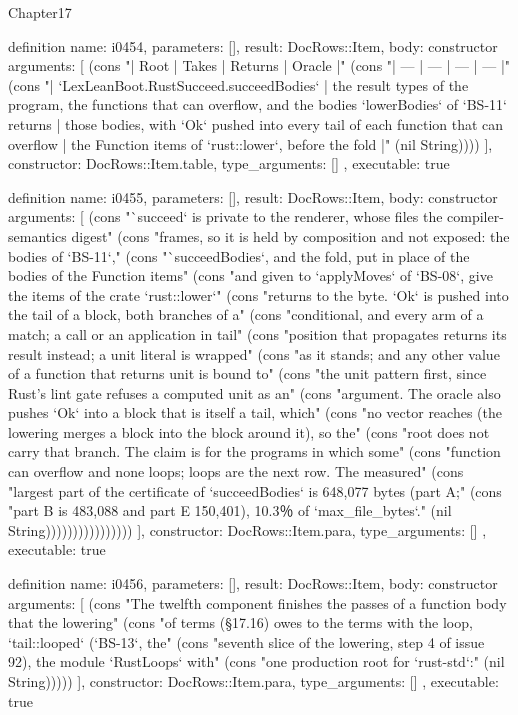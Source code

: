 \begin{lexlean}{Chapter17}
\begin{semanticmodule}
definition{
  name: i0454,
  parameters: [],
  result: DocRows::Item,
  body: constructor{
    arguments: [
      (cons "| Root | Takes | Returns | Oracle |" (cons "| --- | --- | --- | --- |" (cons "| `LexLeanBoot.RustSucceed.succeedBodies` | the result types of the program, the functions that can overflow, and the bodies `lowerBodies` of `BS-11` returns | those bodies, with `Ok` pushed into every tail of each function that can overflow | the Function items of `rust::lower`, before the fold |" (nil String))))
    ],
    constructor: DocRows::Item.table,
    type_arguments: []
  },
  executable: true
}

definition{
  name: i0455,
  parameters: [],
  result: DocRows::Item,
  body: constructor{
    arguments: [
      (cons "`succeed` is private to the renderer, whose files the compiler-semantics digest" (cons "frames, so it is held by composition and not exposed: the bodies of `BS-11`," (cons "`succeedBodies`, and the fold, put in place of the bodies of the Function items" (cons "and given to `applyMoves` of `BS-08`, give the items of the crate `rust::lower`" (cons "returns to the byte. `Ok` is pushed into the tail of a block, both branches of a" (cons "conditional, and every arm of a match; a call or an application in tail" (cons "position that propagates returns its result instead; a unit literal is wrapped" (cons "as it stands; and any other value of a function that returns unit is bound to" (cons "the unit pattern first, since Rust's lint gate refuses a computed unit as an" (cons "argument. The oracle also pushes `Ok` into a block that is itself a tail, which" (cons "no vector reaches (the lowering merges a block into the block around it), so the" (cons "root does not carry that branch. The claim is for the programs in which some" (cons "function can overflow and none loops; loops are the next row. The measured" (cons "largest part of the certificate of `succeedBodies` is 648,077 bytes (part A;" (cons "part B is 483,088 and part E 150,401), 10.3％ of `max_file_bytes`." (nil String))))))))))))))))
    ],
    constructor: DocRows::Item.para,
    type_arguments: []
  },
  executable: true
}

definition{
  name: i0456,
  parameters: [],
  result: DocRows::Item,
  body: constructor{
    arguments: [
      (cons "The twelfth component finishes the passes of a function body that the lowering" (cons "of terms (§17.16) owes to the terms with the loop, `tail::looped` (`BS-13`, the" (cons "seventh slice of the lowering, step 4 of issue 92), the module `RustLoops` with" (cons "one production root for `rust-std`:" (nil String)))))
    ],
    constructor: DocRows::Item.para,
    type_arguments: []
  },
  executable: true
}


\end{semanticmodule}
\end{lexlean}

